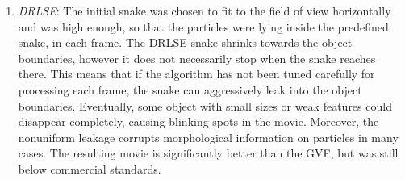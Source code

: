 \documentclass{article}
\begin{document}
\begin{enumerate}
\item \emph{DRLSE}: The initial snake was chosen to fit to the field of view horizontally and was high enough, so that the particles were lying inside the predefined snake, in each frame. The DRLSE snake shrinks towards the object boundaries, however it does not necessarily stop when the snake reaches there. This means that if the algorithm has not been tuned carefully for processing each frame, the snake can aggressively leak into the object boundaries. Eventually, some object with small sizes or weak features could disappear completely, causing blinking spots in the movie. Moreover, the nonuniform leakage corrupts morphological information on particles in many cases. The resulting movie is significantly better than the GVF, but was still below commercial standards.


\end {enumerate}

\end{document}
